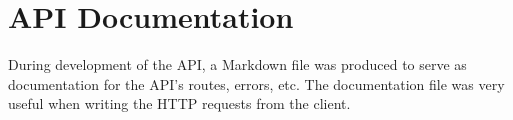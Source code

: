 \chapter{API Documentation}
During development of the API, a Markdown file was produced to serve as documentation for the API's routes, errors, etc. The documentation file was very useful when writing the HTTP requests from the client.

